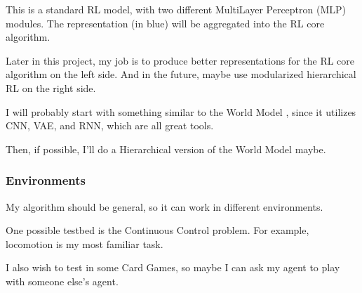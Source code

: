 This is a standard RL model, with two different MultiLayer Perceptron (MLP) modules.
The representation (in blue) will be aggregated into the RL core algorithm.

Later in this project, my job is to produce better representations for the RL core algorithm on the left side.
And in the future, maybe use modularized hierarchical RL on the right side.

I will probably start with something similar to the World Model \cite{ha_world_2018}, since it utilizes CNN, VAE, and RNN, which are all great tools.

Then, if possible, I'll do a Hierarchical version of the World Model maybe.

\subsubsection*{Environments}
My algorithm should be general, so it can work in different environments.

One possible testbed is the Continuous Control problem.
For example, locomotion is my most familiar task.

I also wish to test in some Card Games, so maybe I can ask my agent to play with someone else's agent.






